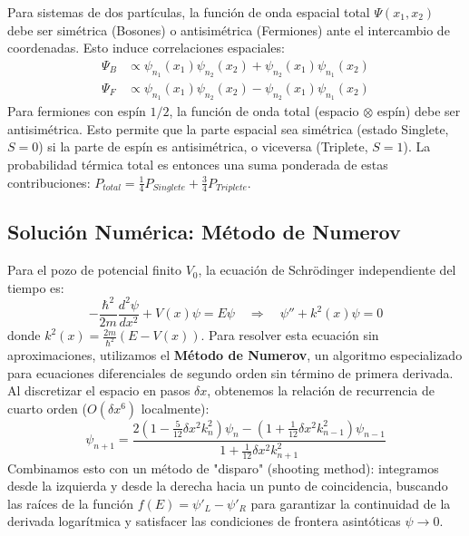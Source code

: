 \documentclass[twocolumn,superscriptaddress,prl,10pt]{revtex4-2}
\begin{document}
Para sistemas de dos partículas, la función de onda espacial total $\Psi(x_1, x_2)$ debe ser simétrica (Bosones) o antisimétrica (Fermiones) ante el intercambio de coordenadas. Esto induce correlaciones espaciales:
\begin{align}
\Psi_B &\propto \psi_{n_1}(x_1)\psi_{n_2}(x_2) + \psi_{n_2}(x_1)\psi_{n_1}(x_2) \\
\Psi_F &\propto \psi_{n_1}(x_1)\psi_{n_2}(x_2) - \psi_{n_2}(x_1)\psi_{n_1}(x_2)
\end{align}
Para fermiones con espín $1/2$, la función de onda total (espacio $\otimes$ espín) debe ser antisimétrica. Esto permite que la parte espacial sea simétrica (estado Singlete, $S=0$) si la parte de espín es antisimétrica, o viceversa (Triplete, $S=1$). La probabilidad térmica total es entonces una suma ponderada de estas contribuciones: $P_{total} = \frac{1}{4}P_{Singlete} + \frac{3}{4}P_{Triplete}$.

\subsection{Solución Numérica: Método de Numerov}
Para el pozo de potencial finito $V_0$, la ecuación de Schrödinger independiente del tiempo es:
\begin{equation}
-\frac{\hbar^2}{2m} \frac{d^2\psi}{dx^2} + V(x)\psi = E\psi \quad \Rightarrow \quad \psi'' + k^2(x)\psi = 0
\end{equation}
donde $k^2(x) = \frac{2m}{\hbar^2}(E - V(x))$. Para resolver esta ecuación sin aproximaciones, utilizamos el \textbf{Método de Numerov}, un algoritmo especializado para ecuaciones diferenciales de segundo orden sin término de primera derivada. Al discretizar el espacio en pasos $\delta x$, obtenemos la relación de recurrencia de cuarto orden ($O(\delta x^6)$ localmente):
\begin{equation}
\psi_{n+1} = \frac{2(1 - \frac{5}{12}\delta x^2 k_n^2)\psi_n - (1 + \frac{1}{12}\delta x^2 k_{n-1}^2)\psi_{n-1}}{1 + \frac{1}{12}\delta x^2 k_{n+1}^2}
\end{equation}
Combinamos esto con un método de "disparo" (shooting method): integramos desde la izquierda y desde la derecha hacia un punto de coincidencia, buscando las raíces de la función $f(E) = \psi'_L - \psi'_R$ para garantizar la continuidad de la derivada logarítmica y satisfacer las condiciones de frontera asintóticas $\psi \to 0$.
\end{document}
